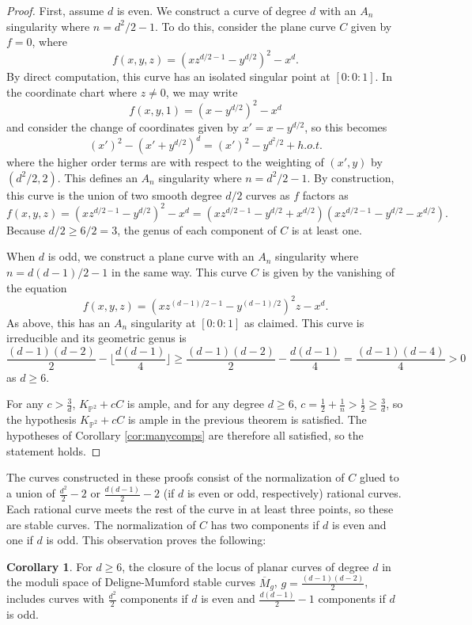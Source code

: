 \documentclass[11pt]{amsart}
\numberwithin{equation}{section}
\theoremstyle{definition}
\newtheorem{corollary}[theorem]{Corollary}
\newcommand{\bP}{\mathbb{P}}
\newcommand{\oM}{\overline M}
\begin{document}
\begin{proof}
    First, assume $d$ is even.  We construct a curve of degree $d$ with an $A_n$ singularity where $n = d^2/2 - 1$.  To do this, consider the plane curve $C$ given by $f = 0$, where
    \[ f(x,y,z) = (xz^{d/2-1} - y^{d/2})^2 - x^d. \]
    By direct computation, this curve has an isolated singular point at $[0:0: 1]$.  In the coordinate chart where $z \ne 0$, we may write 
    \[ f(x,y,1) = (x - y^{d/2})^2 - x^d\]
    and consider the change of coordinates given by $x' = x - y^{d/2}$, so this becomes 
    \[ (x')^2 - (x'+y^{d/2})^d = (x')^2 - y^{d^2/2} + h.o.t.\]
    where the higher order terms are with respect to the weighting of $(x', y)$ by $(d^2/2, 2)$.  This defines an $A_n$ singularity where $n = d^2/2 - 1$.  By construction, this curve is the union of two smooth degree $d/2$ curves as $f$ factors as 
    \[ f(x,y,z) = (xz^{d/2-1} - y^{d/2})^2 - x^d = (xz^{d/2-1} - y^{d/2} +x^{d/2})(xz^{d/2-1} - y^{d/2} -x^{d/2}).\]
    Because $d/2 \ge 6/2 = 3$, the genus of each component of $C$ is at least one. 

    When $d$ is odd, we construct a plane curve with an $A_n$ singularity where $n = d(d-1)/2  - 1$ in the same way.  This curve $C$ is given by the vanishing of the equation 
    \[ f(x,y,z) = (xz^{(d-1)/2-1} - y^{(d-1)/2})^2z - x^d. \]
    As above, this has an $A_n$ singularity at $[0:0:1]$ as claimed.  This curve is irreducible and its geometric genus is  
    \[ \frac{(d-1)(d-2)}{2} - \lfloor \frac{d(d-1)}{4}\rfloor \ge \frac{(d-1)(d-2)}{2} - \frac{d(d-1)}{4} = \frac{(d-1)(d-4)}{4} > 0  \]
    as $d \ge 6$.

    For any $c > \frac{3}{d} $, $K_{\bP^2} + cC$ is ample, and for any degree $d \ge 6$, $c = \frac{1}{2} + \frac{1}{n} > \frac{1}{2} \ge \frac{3}{d}$, so the hypothesis $K_{\bP^2} + cC$ is ample in the previous theorem is satisfied.  The hypotheses of Corollary \ref{cor:manycomps} are therefore all satisfied, so the statement holds. 
\end{proof}

The curves constructed in these proofs consist of the normalization of $C$ glued to a union of $\frac{d^2}{2} - 2$ or $\frac{d(d-1)}{2} - 2$ (if $d$ is even or odd, respectively) rational curves.  Each rational curve meets the rest of the curve in at least three points, so these are stable curves.  The normalization of $C$ has two components if $d$ is even and one if $d$ is odd.  This observation proves the following:

\begin{corollary}
    For $d \ge 6$, the closure of the locus of planar curves of degree $d$ in the moduli space of Deligne-Mumford stable curves $\oM_g$, $g = \frac{(d-1)(d-2)}{2}$, includes curves with $\frac{d^2}{2}$ components if $d$ is even and $\frac{d(d-1)}{2} - 1$ components if $d$ is odd.
\end{corollary}
\end{document}

